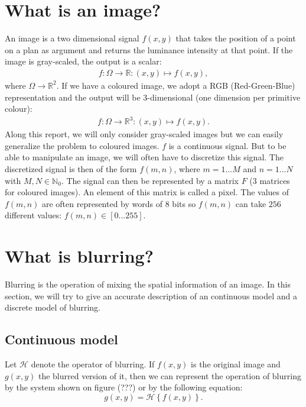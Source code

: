 \label{mathModel}
\section{What is an image?}

An image is a two dimensional signal $f(x,y)$ that takes the position of a point on a plan as argument and returns the luminance intensity at that point. If the image is gray-scaled, the output is a scalar:
\begin{eqnarray}
f:\Omega \rightarrow \mathbb{R}: (x,y) \mapsto f(x,y),
\end{eqnarray}
where $\Omega \rightarrow \mathbb{R}^2$. If we have a coloured image, we adopt a RGB (Red-Green-Blue) representation and the output will be 3-dimensional (one dimension per primitive colour):
\begin{eqnarray}
f:\Omega \rightarrow \mathbb{R}^3 : (x,y) \mapsto f(x,y).
\end{eqnarray}
Along this report, we will only consider gray-scaled images but we can easily generalize the problem to coloured images. $f$ is a continuous signal. But to be able to manipulate an image, we will often have to discretize this signal. The discretized signal is then of the form $f(m,n)$, where $m=1...M$ and $n=1...N$ with $M,N \in \mathbb{N}_0$. The signal can then be represented by a matrix $F$ (3 matrices for coloured images). An element  of this matrix is called a pixel. The values of $f(m,n)$ are often represented by words of $8$ bits so $f(m,n)$ can take $256$ different values: $f(m,n) \in \left[0...255\right]$.

\section{What is blurring?}

Blurring is the operation of mixing the spatial information of an image. In this section, we will try to give an accurate description of an continuous model and a discrete model of blurring.

\subsection{Continuous model}

Let $\mathcal{H}$ denote the operator of blurring. If $f(x,y)$ is the original image and $g(x,y)$ the blurred version of it, then we can represent the operation of blurring by the system shown on figure (???) or by the following equation: %
\begin{equation}
g(x,y) = \mathcal{H}\left\lbrace f(x,y) \right\rbrace.
\end{equation}

